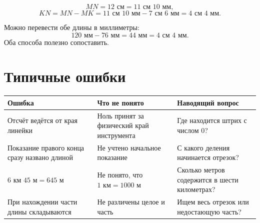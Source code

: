 \begin{checkpointbox}
  \[
    MN=12\text{ см}=11\text{ см }10\text{ мм},
  \]
  \[
    KN=MN-MK=11\text{ см }10\text{ мм}-7\text{ см }6\text{ мм}
      =4\text{ см }4\text{ мм}.
  \]
\end{checkpointbox}

\begin{teacherbox}
  Можно перевести обе длины в миллиметры:
  \[
    120\text{ мм}-76\text{ мм}=44\text{ мм}=4\text{ см }4\text{ мм}.
  \]
  Оба способа полезно сопоставить.
\end{teacherbox}

\section{Типичные ошибки}

\begin{center}
  \renewcommand{\arraystretch}{1.42}
  \begin{tabularx}{\textwidth}{
    >{\raggedright\arraybackslash}p{}
    >{\raggedright\arraybackslash}p{}
    >{\raggedright\arraybackslash}X}
    \toprule
    \rowcolor{TableHeader}
    Ошибка & Что не понято & Наводящий вопрос \\
    \midrule
    Отсчёт ведётся от края линейки
      & Ноль принят за физический край инструмента
      & Где находится штрих с числом \(0\)? \\
    \addlinespace[0.2em]
    Показание правого конца сразу названо длиной
      & Не учтено начальное показание
      & С какого деления начинается отрезок? \\
    \addlinespace[0.2em]
    \(6\text{ км }45\text{ м}=645\text{ м}\)
      & Не понято, что \(1\text{ км}=1000\text{ м}\)
      & Сколько метров содержится в шести километрах? \\
    \addlinespace[0.2em]
    При нахождении части длины складываются
      & Не различены целое и часть
      & Ищем весь отрезок или недостающую часть? \\
    \bottomrule
  \end{tabularx}
\end{center}
